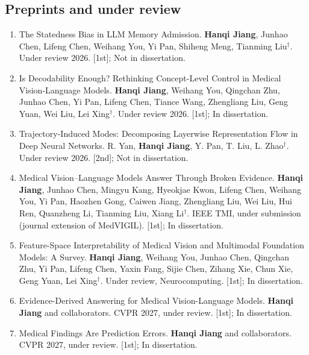 {\subsection*{Preprints and under review}
\begin{enumerate}\renewcommand{\labelenumi}{[\arabic{enumi}]}\setlength{\itemsep}{2pt}\setlength{\parsep}{0pt}\setlength{\topsep}{0pt}
\setcounter{enumi}{20}
\item The Statedness Bias in LLM Memory Admission. \textbf{Hanqi Jiang}, Junhao Chen, Lifeng Chen, Weihang You, Yi Pan, Shiheng Meng, Tianming Liu$^{\dagger}$. Under review 2026. [1st]; Not in dissertation.
\item Is Decodability Enough? Rethinking Concept-Level Control in Medical Vision-Language Models. \textbf{Hanqi Jiang}, Weihang You, Qingchan Zhu, Junhao Chen, Yi Pan, Lifeng Chen, Tiance Wang, Zhengliang Liu, Geng Yuan, Wei Liu, Lei Xing$^{\dagger}$. Under review 2026. [1st]; In dissertation.
\item Trajectory-Induced Modes: Decomposing Layerwise Representation Flow in Deep Neural Networks. R. Yan, \textbf{Hanqi Jiang}, Y. Pan, T. Liu, L. Zhao$^{\dagger}$. Under review 2026. [2nd]; Not in dissertation.
\item Medical Vision--Language Models Answer Through Broken Evidence. \textbf{Hanqi Jiang}, Junhao Chen, Mingyu Kang, Hyeokjae Kwon, Lifeng Chen, Weihang You, Yi Pan, Haozhen Gong, Caiwen Jiang, Zhengliang Liu, Wei Liu, Hui Ren, Quanzheng Li, Tianming Liu, Xiang Li$^{\dagger}$. IEEE TMI, under submission (journal extension of MedVIGIL). [1st]; In dissertation.
\item Feature-Space Interpretability of Medical Vision and Multimodal Foundation Models: A Survey. \textbf{Hanqi Jiang}, Weihang You, Junhao Chen, Qingchan Zhu, Yi Pan, Lifeng Chen, Yaxin Fang, Sijie Chen, Zihang Xie, Chun Xie, Geng Yuan, Lei Xing$^{\dagger}$. Under review, Neurocomputing. [1st]; In dissertation.
\item Evidence-Derived Answering for Medical Vision-Language Models. \textbf{Hanqi Jiang} and collaborators. CVPR 2027, under review. [1st]; In dissertation.
\item Medical Findings Are Prediction Errors. \textbf{Hanqi Jiang} and collaborators. CVPR 2027, under review. [1st]; In dissertation.
\end{enumerate}
}
